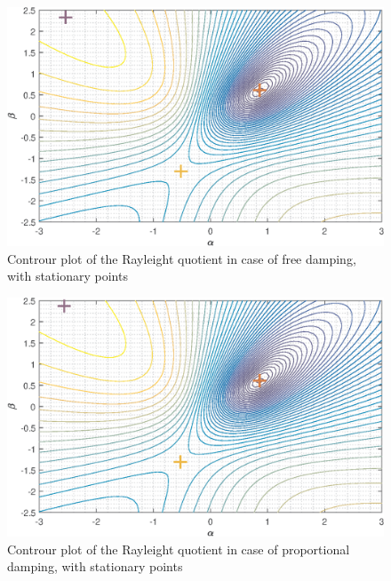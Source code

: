 \documentclass[twosided,a4paper]{article}           %
\begin{document}
\begin{itemize}
\begin{figure}[H]
	\centering
	\includegraphics[width=\linewidth]{img/contour_f}
	\caption{Controur plot of the Rayleight quotient in case of free damping, with stationary points}
	\label{fig:contour_f}
\end{figure}
\begin{figure}[H]
	\centering
	\includegraphics[width=\linewidth]{img/contour_p}
	\caption{Controur plot of the Rayleight quotient in case of proportional damping, with stationary points}
	\label{fig:contour_p}
\end{figure}

	
\end{itemize}
	
\end{document}
